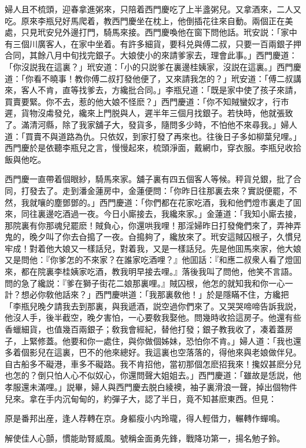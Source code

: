 婦人且不梳頭，迎春拿進粥來，只陪着西門慶吃了上半盞粥兒。又拿酒來，二人又吃。原來李瓶兒好馬爬着，教西門慶坐在枕上，他倒插花往來自動。兩個正在美處，只見玳安兒外邊打門，騎馬來接。西門慶喚他在窗下問他話。玳安説：「家中有三個川廣客人，在家中坐着。有許多細貨，要科兑與傅二叔，只要一百兩銀子押合同，其餘八月中旬找完銀子。大娘使小的來請爹家去，理會此事。」西門慶道：「你沒説我在這裏？」玳安道：「小的只説爹在裏邊桂姨家，沒説在這裏。」西門慶道：「你看不曉事！教你傅二叔打發他便了，又來請我怎的？」玳安道：「傅二叔講來，客人不肯，直等找爹去，方纔批合同。」李瓶兒道：「既是家中使了孩子來請，買賣要緊。你不去，惹的他大娘不怪麽？」西門慶道：「你不知賊蠻奴才，行巿遲，貨物沒䖏發兑，纔來上門脱與人，遲半年三個月找銀子。若快時，他就張致了。滿清河縣，除了我家舖子大，發貨多，隨問多少時，不怕他不來尋我。」婦人道：「買賣不與道路為仇。只依奴，到家打發了再來也。往後日子多如柳葉兒哩。」西門慶於是依聽李瓶兒之言，慢慢起來，梳頭淨面，戴網巾，穿衣服。李瓶兒收拾飯與他吃。

西門慶一直帶着個眼紗，騎馬來家。舖子裏有四五個客人等候。秤貨兑銀，批了合同，打發去了。走到潘金蓮房中，金蓮便問：「你昨日往那裏去來？實説便罷，不然，我就嚷的塵鄧鄧的。」西門慶道：「你們都在花家吃酒，我和他們燈巿裏走了囬來，同往裏邊吃酒過一夜。今日小廝接去，我纔來家。」金蓮道：「我知小廝去接，那院裏有你那魂兒罷麽！賊負心，你還哄我哩！那淫婦昨日打發俺們來了，弄神弄鬼的，晚夕叫了你去㒲搗了一夜。㒲搗夠了，纔放來了。玳安這賊囚根子，久慣兒牢成！對着他大娘又一樣話兒，對着我，又是一樣話兒。先是他囬馬來家，他大娘又是問他：『你爹怎的不來家？在誰家吃酒哩？』他囬話：『和應二叔衆人看了燈囬來，都在院裏李桂姨家吃酒，教我明早接去哩。』落後我叫了問他，他笑不言語。問的急了纔説：『爹在獅子街花二娘那裏哩。』賊囚根，他怎的就知我和你一心一計？想必你敎他話來？」西門慶哄道：「我那裏敎他！」於是隱瞞不住，方纔把「李瓶兒晚夕請我去到那裏，與我遞酒，説空過你們來了。又哭哭啼啼告訴我説，他沒人手，後半截空，晚夕害怕，一心要敎我娶他。問幾時收拾這房子。他還有些香蠟細貨，也值幾百兩銀子；敎我會經紀，替他打發；銀子教我收了，凑着蓋房子，上緊修蓋。他要和你一處住，與你做個姊妹，恐怕你不肯。」婦人道：「我也還多着個影兒在這裏，巴不的他來總好。我這裏也空落落的，得他來與老娘做伴兒。自古船多不礙港，車多不礙路。我不肯招他，當初那個怎麽招我來！攙奴甚麽分兒也怎的？倒只怕人心不似奴心，你還問聲大姐姐去。」西門慶道：「雖故是恁説，他孝服還未滿哩。」説畢，婦人與西門慶去脱白綾襖，袖子裏滑浪一聲，掉出個物件兒來。拿在手内沉甸甸的，約彈子大，認了半日，竟不知甚麽東西。但見：

原是番邦出産，逢人荐轉在京。身軀瘦小内玲瓏，得人輕借力，輾轉作蟬鳴。

解使佳人心顫，慣能助腎威風。號稱金面勇先鋒，戰降功第一，揚名勉子鈴。

